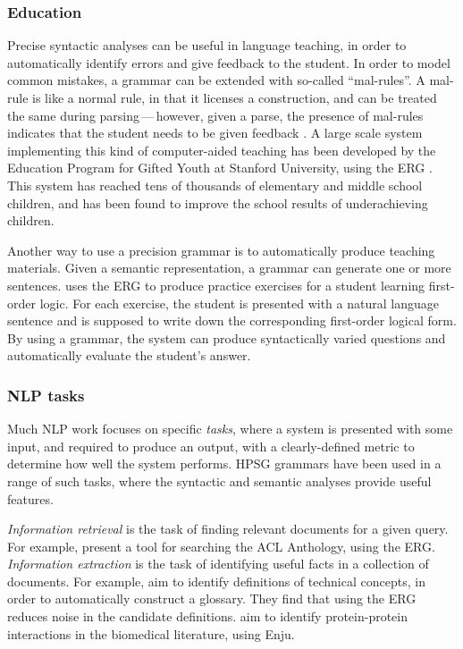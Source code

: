 \documentclass[output=paper,nonflat]{langsci/langscibook}
\begin{document}
\subsubsection{Education}
\label{cl:downstream:edu}

Precise syntactic analyses can be useful in language teaching,
in order to automatically identify errors and give feedback to the student.
In order to model common mistakes,
a grammar can be extended with so-called ``mal-rules''.
A mal-rule is like a normal rule, in that it licenses a construction,
and can be treated the same during parsing\,---\,however, given a parse,
the presence of mal-rules indicates that the student needs to be given feedback
\citep{Ben:Fli:Oep:04,flickinger2013error,morgadodacosta2016error}.
A large scale system implementing this kind of computer-aided teaching has been developed
by the Education Program for Gifted Youth at Stanford University,
using the ERG \citep{suppes2014teach}.
This system has reached tens of thousands of elementary and middle school children,
and has been found to improve the school results of underachieving children.

Another way to use a precision grammar is to automatically produce teaching materials.
Given a semantic representation,
a grammar can generate one or more sentences.
\citet{Flickinger:17} uses the ERG to produce practice exercises for a student learning first-order logic.
For each exercise, the student is presented with a natural language sentence
and is supposed to write down the corresponding first-order logical form.
By using a grammar, the system can produce syntactically varied questions
and automatically evaluate the student's answer.


\subsubsection{NLP tasks}
\label{cl:downstream:nlp}

Much NLP work focuses on specific \textit{tasks},
where a system is presented with some input,
and required to produce an output,
with a clearly-defined metric to determine how well the system performs.
HPSG grammars have been used in a range of such tasks,
where the syntactic and semantic analyses provide useful features.

\textit{Information retrieval} is the task of finding relevant documents for a given query.
For example, \citet{schaefer2011acl} present a tool for searching the ACL Anthology, using the ERG.
\textit{Information extraction} is the task of identifying useful facts in a collection of documents.
For example, \citet{reiplinger2012glossary} aim to identify definitions of technical concepts,
in order to automatically construct a glossary.
They find that using the ERG reduces noise in the candidate definitions.
\citet{miyao2008protein} aim to identify protein-protein interactions in the biomedical literature, using Enju.
\end{document}
